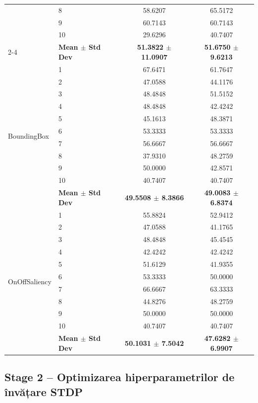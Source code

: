 \begin{table}[htbp]
\begin{tabular}{llcc}
		& 8  & 58.6207 & 65.5172 \\
		& 9  & 60.7143 & 60.7143 \\
		& 10 & 29.6296 & 40.7407 \\
		\cmidrule{2-4}
		& \textbf{Mean $\pm$ Std Dev} & \textbf{51.3822 $\pm$ 11.0907} & \textbf{51.6750 $\pm$ 9.6213} \\
		\midrule
		\multirow{11}{*}{BoundingBox} 
		& 1  & 67.6471 & 61.7647 \\
		& 2  & 47.0588 & 44.1176 \\
		& 3  & 48.4848 & 51.5152 \\
		& 4  & 48.4848 & 42.4242 \\
		& 5  & 45.1613 & 48.3871 \\
		& 6  & 53.3333 & 53.3333 \\
		& 7  & 56.6667 & 56.6667 \\
		& 8  & 37.9310 & 48.2759 \\
		& 9  & 50.0000 & 42.8571 \\
		& 10 & 40.7407 & 40.7407 \\
		\cmidrule{2-4}
		& \textbf{Mean $\pm$ Std Dev} & \textbf{49.5508 $\pm$ 8.3866} & \textbf{49.0083 $\pm$ 6.8374} \\
		\midrule
		\multirow{11}{*}{OnOffSaliency} 
		& 1  & 55.8824 & 52.9412 \\
		& 2  & 47.0588 & 41.1765 \\
		& 3  & 48.4848 & 45.4545 \\
		& 4  & 42.4242 & 42.4242 \\
		& 5  & 51.6129 & 41.9355 \\
		& 6  & 53.3333 & 50.0000 \\
		& 7  & 66.6667 & 63.3333 \\
		& 8  & 44.8276 & 48.2759 \\
		& 9  & 50.0000 & 50.0000 \\
		& 10 & 40.7407 & 40.7407 \\
		\cmidrule{2-4}
		& \textbf{Mean $\pm$ Std Dev} & \textbf{50.1031 $\pm$ 7.5042} & \textbf{47.6282 $\pm$ 6.9907} \\
		\bottomrule
	\end{tabular}
\end{table}

\subsection*{Stage 2 -- Optimizarea hiperparametrilor de învățare STDP}

